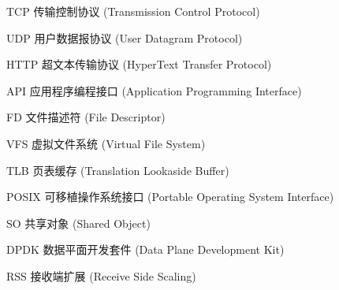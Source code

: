 \begin{denotation}[3cm]
\item[TCP] 传输控制协议  (Transmission Control Protocol)
\item[UDP] 用户数据报协议  (User Datagram Protocol) 
\item[HTTP] 超文本传输协议  (HyperText Transfer Protocol)
\item[API] 应用程序编程接口 (Application Programming Interface)
\item[FD] 文件描述符 (File Descriptor)
\item[VFS] 虚拟文件系统 (Virtual File System)
\item[TLB] 页表缓存 (Translation Lookaside Buffer)
\item[POSIX] 可移植操作系统接口 (Portable Operating System Interface)
\item[SO] 共享对象 (Shared Object)
\item[DPDK] 数据平面开发套件 (Data Plane Development Kit)
\item[RSS] 接收端扩展 (Receive Side Scaling)
\end{denotation}

